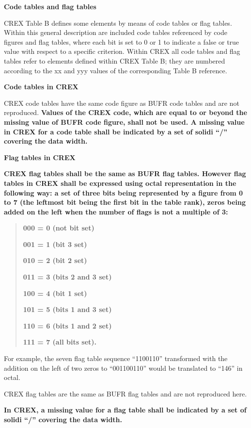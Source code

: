 \textbf{Code tables and flag tables}

CREX Table B defines some elements by means of code tables or flag tables. Within this general description are included code tables referenced by code figures and flag tables, where each bit is set to 0 or 1 to indicate a false or true value with respect to a specific criterion. Within CREX all code tables and flag tables refer to elements defined within CREX Table B; they are numbered according to the xx and yyy values of the corresponding Table B reference.

\textbf{Code tables in CREX}

CREX code tables have the same code figure as BUFR code tables and are not reproduced. \textbf{Values of the CREX code, which are equal to or beyond the missing value of BUFR code figure, shall not be used. A missing value in CREX for a code table shall be indicated by a set of solidi ``/'' covering the data width.}

\textbf{Flag tables in CREX}

\textbf{CREX flag tables shall be the same as BUFR flag tables. However flag tables in CREX shall be expressed using octal representation in the following way: a set of three bits being represented by a figure from 0 to 7 (the leftmost bit being the first bit in the table rank), zeros being added on the left when the number of flags is not a multiple of 3:}

\begin{quote}
\textbf{000 = 0 (not bit set)}

\textbf{001 = 1 (bit 3 set)}

\textbf{010 = 2 (bit 2 set)}

\textbf{011 = 3 (bits 2 and 3 set)}

\textbf{100 = 4 (bit 1 set)}

\textbf{101 = 5 (bits 1 and 3 set)}

\textbf{110 = 6 (bits 1 and 2 set)}

\textbf{111 = 7 (all bits set).}
\end{quote}

For example, the seven flag table sequence ``1100110'' transformed with the addition on the left of two zeros to ``001100110'' would be translated to ``146'' in octal.

CREX flag tables are the same as BUFR flag tables and are not reproduced here.

\textbf{In CREX, a missing value for a flag table shall be indicated by a set of solidi ``/'' covering the data width.}

